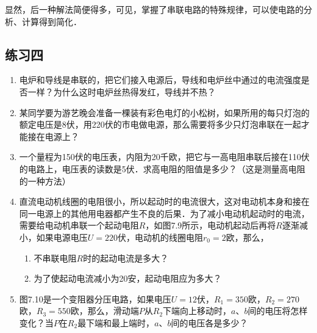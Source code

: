 显然，后一种解法简便得多，可见，掌握了串联电路的特殊规律，可以使电路的分析、计算得到简化．

\subsection*{练习四}
\begin{enumerate}
    \item 电炉和导线是串联的，把它们接入电源后，导线和电炉丝中通过的电流强度是否一样？为什么这时电炉丝热得发红，导线并不热？
    \item 某同学要为游艺晚会准备一棵装有彩色电灯的小松树，如果所用的每只灯泡的额定电压是8伏，用220伏的市电做电源，那么需要将多少只灯泡串联在一起才能接在电源上？
    \item 一个量程为150伏的电压表，内阻为20千欧，把它与一高电阻串联后接在110伏的电路上，电压表的读数是5伏．求高电阻的阻值是多少？（这是测量高电阻的一种方法）
    \item 直流电动机线圈的电阻很小，所以起动时的电流很大，这对电动机本身和接在同一电源上的其他用电器都产生不良的后果．为了减小电动机起动时的电流，需要给电动机串联一个起动电阻$R$，如图7.9所示，电动机起动后再将$R$逐渐减小，如果电源电压$U=220$伏，电动机的线圈电阻$r_0=2$欧，那么，
    
    \begin{enumerate}
        \item 不串联电阻$R$时的起动电流是多大？
        \item 为了使起动电流减小为20安，起动电阻应为多大？
    \end{enumerate}
    \item 图7.10是一个变阻器分压电路，如果电压$U=12$伏，$R_1=350$欧，$R_2=270$欧，$R_3=550$欧，那么，滑动端$P$从$R_2$下端向上移动时，$a$、$b$间的电压将怎样变化？当$P$在$R_2$最下端和最上端时，$a$、$b$间的电压各是多少？	
\end{enumerate}

